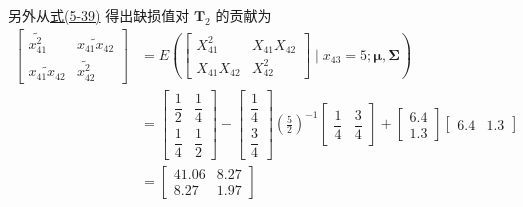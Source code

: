 另外从\hyperref[eq:5-39]{式(5-39)} 得出缺损值对 $\mathbf{T}_{2}$ 的贡献为
\begin{align*}
\begin{bmatrix}
\widetilde{x_{41}^{2}}&\widetilde{x_{41}x_{42}}\\[1mm]
\widetilde{x_{41}x_{42}}&\widetilde{x_{42}^{2}}
\end{bmatrix}
&=E\left(\begin{bmatrix}X_{41}^{2}&X_{41}X_{42}\\X_{41}X_{42}&X_{42}^{2}\end{bmatrix}\mid x_{43}=5;\boldsymbol{\mu},\boldsymbol{\Sigma}\right)\\
&=\begin{bmatrix}\dfrac{1}{2}&\dfrac{1}{4}\\[2mm]\dfrac{1}{4}&\dfrac{1}{2}\end{bmatrix}
-\begin{bmatrix}\dfrac{1}{4}\\[2mm]\dfrac{3}{4}\end{bmatrix}
\left(\frac{5}{2}\right)^{-1}
\begin{bmatrix}\dfrac{1}{4}&\dfrac{3}{4}\end{bmatrix}
+\begin{bmatrix}6.4\\1.3\end{bmatrix}\begin{bmatrix}6.4&1.3\end{bmatrix}\\
&=\begin{bmatrix}41.06&8.27\\8.27&1.97\end{bmatrix}
\end{align*}
